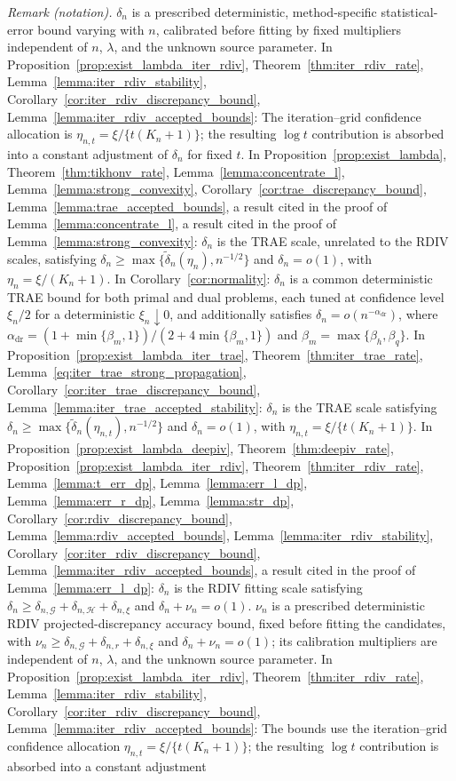 \documentclass[12pt]{article}
\theoremstyle{plain}
\theoremstyle{definition}
\theoremstyle{remark}
\begin{document}
\noindent\textit{Remark (notation).} $\delta_n$ is a prescribed deterministic, method-specific statistical-error bound varying with $n$, calibrated before fitting by fixed multipliers independent of $n$, $\lambda$, and the unknown source parameter. In Proposition~\ref{prop:exist_lambda_iter_rdiv}, Theorem~\ref{thm:iter_rdiv_rate}, Lemma~\ref{lemma:iter_rdiv_stability}, Corollary~\ref{cor:iter_rdiv_discrepancy_bound}, Lemma~\ref{lemma:iter_rdiv_accepted_bounds}: The iteration--grid confidence allocation is $\eta_{n,t}=\xi/\{t(K_n+1)\}$; the resulting $\log t$ contribution is absorbed into a constant adjustment of $\delta_n$ for fixed $t$. In Proposition~\ref{prop:exist_lambda}, Theorem~\ref{thm:tikhonv_rate}, Lemma~\ref{lemma:concentrate_l}, Lemma~\ref{lemma:strong_convexity}, Corollary~\ref{cor:trae_discrepancy_bound}, Lemma~\ref{lemma:trae_accepted_bounds}, a result cited in the proof of Lemma~\ref{lemma:concentrate_l}, a result cited in the proof of Lemma~\ref{lemma:strong_convexity}: $\delta_n$ is the TRAE scale, unrelated to the RDIV scales, satisfying $\delta_n\geqslant\max\{\tilde\delta_n(\eta_n),n^{-1/2}\}$ and $\delta_n=o(1)$, with $\eta_n=\xi/(K_n+1)$. In Corollary~\ref{cor:normality}: $\delta_n$ is a common deterministic TRAE bound for both primal and dual problems, each tuned at confidence level $\xi_n/2$ for a deterministic $\xi_n\downarrow0$, and additionally satisfies $\delta_n=o(n^{-\alpha_{\mathrm{dr}}})$, where $\alpha_{\mathrm{dr}}=(1+\min\{\beta_m,1\})/(2+4\min\{\beta_m,1\})$ and $\beta_m=\max\{\beta_h,\beta_q\}$. In Proposition~\ref{prop:exist_lambda_iter_trae}, Theorem~\ref{thm:iter_trae_rate}, Lemma~\ref{eq:iter_trae_strong_propagation}, Corollary~\ref{cor:iter_trae_discrepancy_bound}, Lemma~\ref{lemma:iter_trae_accepted_stability}: $\delta_n$ is the TRAE scale satisfying $\delta_n\geqslant\max\{\tilde\delta_n(\eta_{n,t}),n^{-1/2}\}$ and $\delta_n=o(1)$, with $\eta_{n,t}=\xi/\{t(K_n+1)\}$. In Proposition~\ref{prop:exist_lambda_deepiv}, Theorem~\ref{thm:deepiv_rate}, Proposition~\ref{prop:exist_lambda_iter_rdiv}, Theorem~\ref{thm:iter_rdiv_rate}, Lemma~\ref{lemma:t_err_dp}, Lemma~\ref{lemma:err_l_dp}, Lemma~\ref{lemma:err_r_dp}, Lemma~\ref{lemma:str_dp}, Corollary~\ref{cor:rdiv_discrepancy_bound}, Lemma~\ref{lemma:rdiv_accepted_bounds}, Lemma~\ref{lemma:iter_rdiv_stability}, Corollary~\ref{cor:iter_rdiv_discrepancy_bound}, Lemma~\ref{lemma:iter_rdiv_accepted_bounds}, a result cited in the proof of Lemma~\ref{lemma:err_l_dp}: $\delta_n$ is the RDIV fitting scale satisfying $\delta_n\geqslant\delta_{n,\mathcal G}+\delta_{n,\mathcal H}+\delta_{n,\xi}$ and $\delta_n+\nu_n=o(1)$. $\nu_n$ is a prescribed deterministic RDIV projected-discrepancy accuracy bound, fixed before fitting the candidates, with $\nu_n\geqslant\delta_{n,\mathcal G}+\delta_{n,r}+\delta_{n,\xi}$ and $\delta_n+\nu_n=o(1)$; its calibration multipliers are independent of $n$, $\lambda$, and the unknown source parameter. In Proposition~\ref{prop:exist_lambda_iter_rdiv}, Theorem~\ref{thm:iter_rdiv_rate}, Lemma~\ref{lemma:iter_rdiv_stability}, Corollary~\ref{cor:iter_rdiv_discrepancy_bound}, Lemma~\ref{lemma:iter_rdiv_accepted_bounds}: The bounds use the iteration--grid confidence allocation $\eta_{n,t}=\xi/\{t(K_n+1)\}$; the resulting $\log t$ contribution is absorbed into a constant adjustment 
\end{document}
